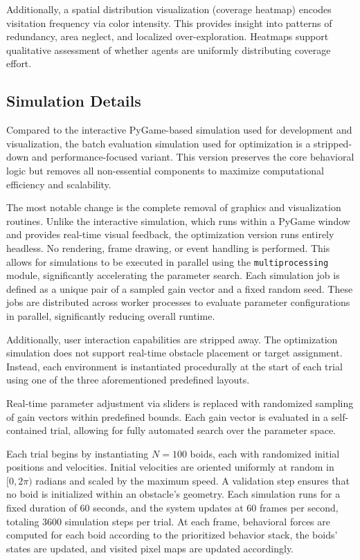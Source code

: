 \documentclass[12pt]{article}
\begin{document}
Additionally, a spatial distribution visualization (coverage heatmap) encodes visitation frequency via color intensity. This provides insight into patterns of redundancy, area neglect, and localized over-exploration. Heatmaps support qualitative assessment of whether agents are uniformly distributing coverage effort.

\subsection{Simulation Details}

Compared to the interactive PyGame-based simulation used for development and visualization, the batch evaluation simulation used for optimization is a stripped-down and performance-focused variant. This version preserves the core behavioral logic but removes all non-essential components to maximize computational efficiency and scalability.

The most notable change is the complete removal of graphics and visualization routines. Unlike the interactive simulation, which runs within a PyGame window and provides real-time visual feedback, the optimization version runs entirely headless. No rendering, frame drawing, or event handling is performed. This allows for simulations to be executed in parallel using the \texttt{multiprocessing} module, significantly accelerating the parameter search. Each simulation job is defined as a unique pair of a sampled gain vector and a fixed random seed. These jobs are distributed across worker processes to evaluate parameter configurations in parallel, significantly reducing overall runtime.

Additionally, user interaction capabilities are stripped away. The optimization simulation does not support real-time obstacle placement or target assignment. Instead, each environment is instantiated procedurally at the start of each trial using one of the three aforementioned predefined layouts.

Real-time parameter adjustment via sliders is replaced with randomized sampling of gain vectors within predefined bounds. Each gain vector is evaluated in a self-contained trial, allowing for fully automated search over the parameter space.

Each trial begins by instantiating \(N = 100\) boids, each with randomized initial positions and velocities. Initial velocities are oriented uniformly at random in \([0, 2\pi)\) radians and scaled by the maximum speed. A validation step ensures that no boid is initialized within an obstacle's geometry. Each simulation runs for a fixed duration of 60 seconds, and the system updates at 60 frames per second, totaling 3600 simulation steps per trial. At each frame, behavioral forces are computed for each boid according to the prioritized behavior stack, the boids' states are updated, and visited pixel maps are updated accordingly.
\end{document}
